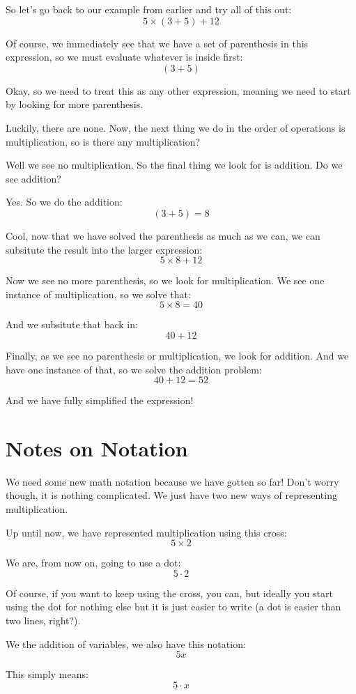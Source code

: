 \documentclass{article}
\begin{document}
So let's go back to our example from earlier and try all of this out: 
\[ 5 \times (3 + 5) + 12 \]

Of course, we immediately see that we have a set of parenthesis in this expression, so we must evaluate whatever is inside first: 
\[ (3+5) \]

Okay, so we need to treat this as any other expression, meaning we need to start by looking for more parenthesis. 

Luckily, there are none. Now, the next thing we do in the order of operations is multiplication, so is there any multiplication? 

Well we see no multiplication. So the final thing we look for is addition. Do we see addition? 

Yes. So we do the addition: 
\[ (3+5) = 8 \]

Cool, now that we have solved the parenthesis as much as we can, we can subsitute the result into the larger expression: 
\[ 5 \times 8 + 12 \]

Now we see no more parenthesis, so we look for multiplication. We see one instance of multiplication, so we solve that: 
\[ 5 \times 8  = 40\]

And we subsitute that back in: 
\[ 40 + 12 \] 

Finally, as we see no parenthesis or multiplication, we look for addition. And we have one instance of that, so we solve the addition problem: 
\[ 40 + 12 = 52 \] 

And we have fully simplified the expression! 

\section*{Notes on Notation}
We need some new math notation because we have gotten so far! Don't worry though, it is nothing complicated. We just have two new ways of representing multiplication.

Up until now, we have represented multiplication using this cross:
\[ 5 \times 2 \]

We are, from now on, going to use a dot: 
\[ 5 \cdot 2 \]

Of course, if you want to keep using the cross, you can, but ideally you start using the dot for nothing else but it is just easier to write (a dot is easier than two lines, right?). 

We the addition of variables, we also have this notation: 
\[ 5x \]

This simply means:
\[ 5 \cdot x \]
\end{document}
